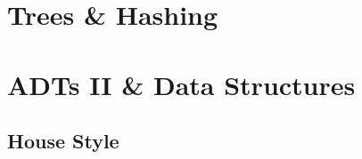 










\chapter{Trees \& Hashing}










\chapter{ADTs II \& Data Structures }







%

\appendix
\begin{appendices}

\chapter{House Style}
\label{appendix:style}


%

%

\end{appendices}


